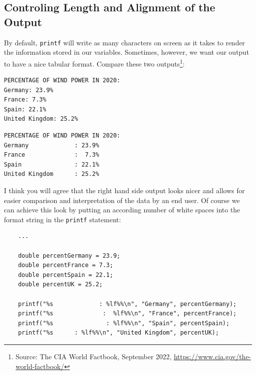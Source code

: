 \subsection{Controling Length and Alignment of the Output}
By default, \texttt{printf} will write as many characters on screen as it takes to render the information stored in our variables. Sometimes, however, we want our output to have a nice tabular format. Compare these two outputs\footnote{Source: The CIA World Factbook, September 2022, \url{https://www.cia.gov/the-world-factbook/}}:
\begin{tcbraster}[raster columns=2,
                  raster equal height,
                  nobeforeafter,
                  raster column skip=0.2cm]
\begin{cmdbox}
\begin{verbatim}
PERCENTAGE OF WIND POWER IN 2020:
Germany: 23.9%
France: 7.3%
Spain: 22.1%
United Kingdom: 25.2%
\end{verbatim}
\end{cmdbox}
%
\begin{cmdbox}
\begin{verbatim}
PERCENTAGE OF WIND POWER IN 2020:
Germany             : 23.9%
France              :  7.3%
Spain               : 22.1%
United Kingdom      : 25.2%
\end{verbatim}
\end{cmdbox}
\end{tcbraster}

I think you will agree that the right hand side output looks nicer and allows for easier comparison and interpretation of the data by an end user. Of course we can achieve this look by putting an according number of white spaces into the format string in the \texttt{printf} statement:
\begin{codebox}[manuallyAlignedOutput.c]
\begin{verbatim}
    ...

    double percentGermany = 23.9;
    double percentFrance = 7.3;
    double percentSpain = 22.1;
    double percentUK = 25.2;

    printf("%s             : %lf%%\n", "Germany", percentGermany);
    printf("%s              :  %lf%%\n", "France", percentFrance);
    printf("%s               : %lf%%\n", "Spain", percentSpain);
    printf("%s      : %lf%%\n", "United Kingdom", percentUK);
\end{verbatim}
\end{codebox}

